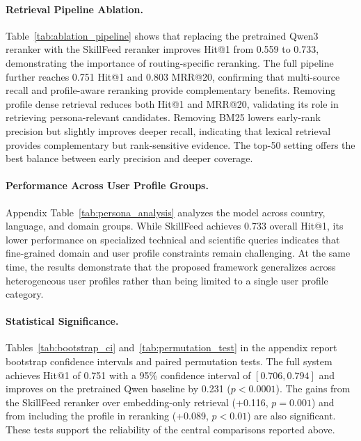 \documentclass[letterpaper]{article} %
\begin{document}
\paragraph{Retrieval Pipeline Ablation.}
Table~\ref{tab:ablation_pipeline} shows that replacing the pretrained Qwen3 reranker with the SkillFeed reranker improves Hit@1 from 0.559 to 0.733, demonstrating the importance of routing-specific reranking. The full pipeline further reaches 0.751 Hit@1 and 0.803 MRR@20, confirming that multi-source recall and profile-aware reranking provide complementary benefits. Removing profile dense retrieval reduces both Hit@1 and MRR@20, validating its role in retrieving persona-relevant candidates. Removing BM25 lowers early-rank precision but slightly improves deeper recall, indicating that lexical retrieval provides complementary but rank-sensitive evidence. The top-50 setting offers the best balance between early precision and deeper coverage.

\paragraph{Performance Across User Profile Groups.}
Appendix Table~\ref{tab:persona_analysis} analyzes the model across country, language, and domain groups. While SkillFeed achieves 0.733 overall Hit@1, its lower performance on specialized technical and scientific queries indicates that fine-grained domain and user profile constraints remain challenging. At the same time, the results demonstrate that the proposed framework generalizes across heterogeneous user profiles rather than being limited to a single user profile category.

\paragraph{Statistical Significance.}
Tables~\ref{tab:bootstrap_ci} and~\ref{tab:permutation_test} in the appendix report bootstrap confidence intervals and paired permutation tests. The full system achieves Hit@1 of 0.751 with a 95\% confidence interval of $[0.706, 0.794]$ and improves on the pretrained Qwen baseline by 0.231 ($p<0.0001$). The gains from the SkillFeed reranker over embedding-only retrieval (+0.116, $p=0.001$) and from including the profile in reranking (+0.089, $p<0.01$) are also significant. These tests support the reliability of the central comparisons reported above.
\end{document}
